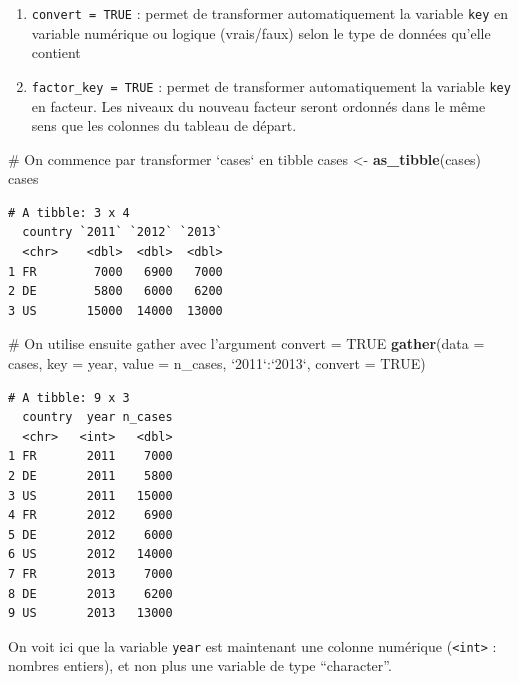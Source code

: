 \documentclass[a4paperpaper,]{article}
\newenvironment{Shaded}{\begin{snugshade}}{\end{snugshade}}
\newcommand{\CommentTok}[1]{\textcolor[rgb]{0.54,0.53,0.53}{#1}}
\newcommand{\DataTypeTok}[1]{\textcolor[rgb]{0.00,0.34,0.68}{#1}}
\newcommand{\KeywordTok}[1]{\textcolor[rgb]{0.12,0.11,0.11}{\textbf{#1}}}
\newcommand{\NormalTok}[1]{\textcolor[rgb]{0.12,0.11,0.11}{#1}}
\newcommand{\OperatorTok}[1]{\textcolor[rgb]{0.12,0.11,0.11}{#1}}
\newcommand{\OtherTok}[1]{\textcolor[rgb]{0.00,0.43,0.16}{#1}}
\newcommand{\StringTok}[1]{\textcolor[rgb]{0.75,0.01,0.01}{#1}}
\providecommand{\tightlist}{%
  \setlength{\itemsep}{0pt}\setlength{\parskip}{0pt}}
\theoremstyle{definition}
\theoremstyle{definition}
\theoremstyle{definition}
\theoremstyle{remark}
\begin{document}
\begin{enumerate}
\def\labelenumi{\arabic{enumi}.}
\tightlist
\item
  \texttt{convert\ =\ TRUE} : permet de transformer automatiquement la
  variable \texttt{key} en variable numérique ou logique (vrais/faux)
  selon le type de données qu'elle contient
\item
  \texttt{factor\_key\ =\ TRUE} : permet de transformer automatiquement
  la variable \texttt{key} en facteur. Les niveaux du nouveau facteur
  seront ordonnés dans le même sens que les colonnes du tableau de
  départ.
\end{enumerate}

\begin{Shaded}
\begin{Highlighting}[]
\CommentTok{# On commence par transformer `cases` en tibble}
\NormalTok{cases <-}\StringTok{ }\KeywordTok{as_tibble}\NormalTok{(cases)}
\NormalTok{cases}
\end{Highlighting}
\end{Shaded}

\begin{verbatim}
# A tibble: 3 x 4
  country `2011` `2012` `2013`
  <chr>    <dbl>  <dbl>  <dbl>
1 FR        7000   6900   7000
2 DE        5800   6000   6200
3 US       15000  14000  13000
\end{verbatim}

\begin{Shaded}
\begin{Highlighting}[]
\CommentTok{# On utilise ensuite gather avec l'argument convert = TRUE}
\KeywordTok{gather}\NormalTok{(}\DataTypeTok{data =}\NormalTok{ cases, }\DataTypeTok{key =}\NormalTok{ year, }\DataTypeTok{value =}\NormalTok{ n_cases, }\StringTok{`}\DataTypeTok{2011}\StringTok{`}\OperatorTok{:}\StringTok{`}\DataTypeTok{2013}\StringTok{`}\NormalTok{, }\DataTypeTok{convert =} \OtherTok{TRUE}\NormalTok{)}
\end{Highlighting}
\end{Shaded}

\begin{verbatim}
# A tibble: 9 x 3
  country  year n_cases
  <chr>   <int>   <dbl>
1 FR       2011    7000
2 DE       2011    5800
3 US       2011   15000
4 FR       2012    6900
5 DE       2012    6000
6 US       2012   14000
7 FR       2013    7000
8 DE       2013    6200
9 US       2013   13000
\end{verbatim}

On voit ici que la variable \texttt{year} est maintenant une colonne
numérique (\texttt{\textless{}int\textgreater{}} : nombres entiers), et
non plus une variable de type ``character''.
\end{document}
